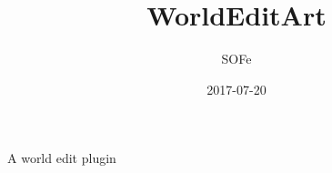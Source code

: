 \documentclass{artitlce}
\title{WorldEditArt}
\date{2017-07-20}
\author{SOFe}
\begin{document}
	\maketitle
	A world edit plugin
\end{document}
